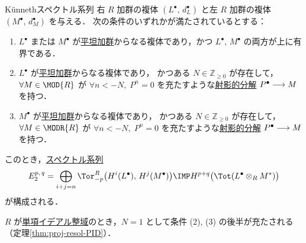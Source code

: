 \documentclass[algtopo_main]{subfiles}
\begin{document}
\begin{mytheo}[label=SS:Kunneth]{K\"unnethスペクトル系列}
    右 $R$ 加群の複体 $(L^\bullet,\, d_L^\bullet)$ と左 $R$ 加群の複体 $(M^\bullet,\, d_M^\bullet)$ を与える．
    次の条件のいずれかが満たされているとする：
    \begin{enumerate}
        \item $L^\bullet$ または $M^\bullet$ が\hyperref[def:flat-mod]{平坦加群}からなる複体であり，かつ $L^\bullet,\, M^\bullet$ の両方が上に有界である．
        \item $L^\bullet$ が\hyperref[def:flat-mod]{平坦加群}からなる複体であり，
        かつある $N \in \mathbb{Z}_{\ge 0}$ が存在して，$\forall M \in \MOD{R}$ が $\forall n < -N,\; P^n = 0$ を充たすような\hyperref[def:projective-resolution]{射影的分解} $P^\bullet \longrightarrow M$ を持つ．
        \item $M^\bullet$ が\hyperref[def:flat-mod]{平坦加群}からなる複体であり，
        かつある $N \in \mathbb{Z}_{\ge 0}$ が存在して，$\forall M \in \MODR{R}$ が $\forall n < -N,\; P^n = 0$ を充たすような\hyperref[def:projective-resolution]{射影的分解} $P^\bullet \longrightarrow M$ を持つ．
    \end{enumerate}
    
    このとき，\hyperref[def:SSQ]{スペクトル系列}
    \begin{align}
        E_2^{p,\, q} = \bigoplus_{i+j = n} \Tor^R_{-p} \bigl( H^i(L^\bullet),\, H^j(M^\bullet) \bigr) \IMP H^{p+q} \bigl( \Tot(L^\bullet \otimes_R M^*) \bigr) 
    \end{align}
    が構成される．
\end{mytheo}

\begin{marker}
    $R$ が\hyperref[def:PID]{単項イデアル整域}のとき，$N=1$ として条件 (2), (3) の後半が充たされる（定理\ref{thm:proj-resol-PID}）．
\end{marker}
\end{document}
